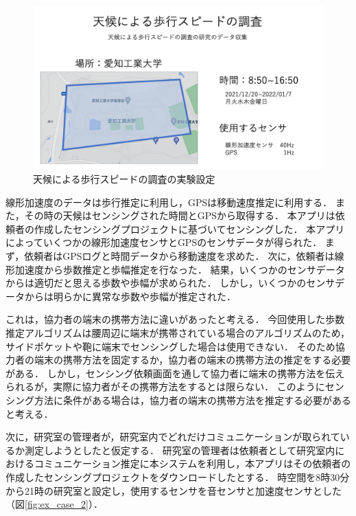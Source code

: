 \begin{figure}[tbh]
    \centering
    \includegraphics[width=16cm]{img_ex_case_1.png}
    \caption{天候による歩行スピードの調査の実験設定}
    \label{fig:ex_case_1}
\end{figure}

線形加速度のデータは歩行推定に利用し，GPSは移動速度推定に利用する．
また，その時の天候はセンシングされた時間とGPSから取得する．
本アプリは依頼者の作成したセンシングプロジェクトに基づいてセンシングした．
本アプリによっていくつかの線形加速度センサとGPSのセンサデータが得られた．
まず，依頼者はGPSログと時間データから移動速度を求めた．
次に，依頼者は線形加速度から歩数推定と歩幅推定を行なった．
結果，いくつかのセンサデータからは適切だと思える歩数や歩幅が求められた．
しかし，いくつかのセンサデータからは明らかに異常な歩数や歩幅が推定された．

これは，協力者の端末の携帯方法に違いがあったと考える．
今回使用した歩数推定アルゴリズムは腰周辺に端末が携帯されている場合のアルゴリズムのため，サイドポケットや鞄に端末でセンシングした場合は使用できない．
そのため協力者の端末の携帯方法を固定するか，協力者の端末の携帯方法の推定をする必要がある．
しかし，センシング依頼画面を通して協力者に端末の携帯方法を伝えられるが，実際に協力者がその携帯方法をするとは限らない．
このようにセンシング方法に条件がある場合は，協力者の端末の携帯方法を推定する必要があると考える．

次に，研究室の管理者が，研究室内でどれだけコミュニケーションが取られているか測定しようとしたと仮定する．
研究室の管理者は依頼者として研究室内におけるコミュニケーション推定に本システムを利用し，本アプリはその依頼者の作成したセンシングプロジェクトをダウンロードしたとする．
時空間を8時30分から21時の研究室と設定し，使用するセンサを音センサと加速度センサとした（図\ref{fig:ex_case_2}）．

